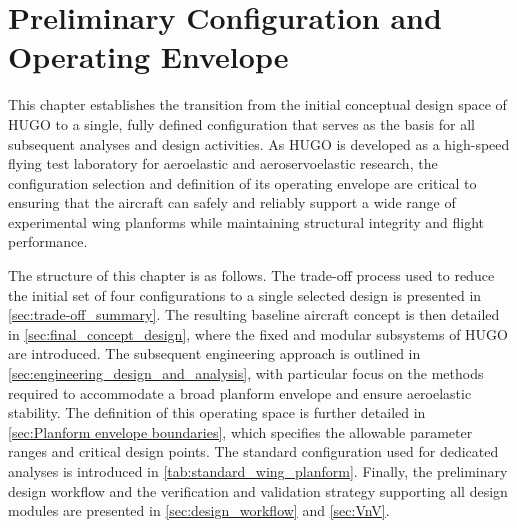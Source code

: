 \chapter{Preliminary Configuration and Operating Envelope} 
\label{ch:management}

This chapter establishes the transition from the initial conceptual design space of HUGO to a single, fully defined configuration that serves as the basis for all subsequent analyses and design activities. As HUGO is developed as a high-speed flying test laboratory for aeroelastic and aeroservoelastic research, the configuration selection and definition of its operating envelope are critical to ensuring that the aircraft can safely and reliably support a wide range of experimental wing planforms while maintaining structural integrity and flight performance.

The structure of this chapter is as follows. The trade-off process used to reduce the initial set of four configurations to a single selected design is presented in \autoref{sec:trade-off_summary}. The resulting baseline aircraft concept is then detailed in \autoref{sec:final_concept_design}, where the fixed and modular subsystems of HUGO are introduced. The subsequent engineering approach is outlined in \autoref{sec:engineering_design_and_analysis}, with particular focus on the methods required to accommodate a broad planform envelope and ensure aeroelastic stability. The definition of this operating space is further detailed in \autoref{sec:Planform envelope boundaries}, which specifies the allowable parameter ranges and critical design points. The standard configuration used for dedicated analyses is introduced in \autoref{tab:standard_wing_planform}. Finally, the preliminary design workflow and the verification and validation strategy supporting all design modules are presented in \autoref{sec:design_workflow} and \autoref{sec:VnV}.

